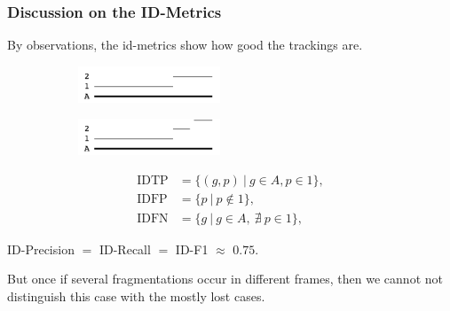 \documentclass[slidetop, mathserif, dvipsnames]{beamer}
\begin{document}
\begin{frame}
	\frametitle{Discussion on the ID-Metrics}
			
	By observations, the id-metrics show how good the trackings are.

	\quad
	
	\begin{figure}
		\begin{subfigure}{.5\textwidth}
			\centering
			\includegraphics[width=120pt]{pics/fig6.png}
		\end{subfigure}%
		\begin{subfigure}{.5\textwidth}
			\centering
			\includegraphics[width=120pt]{pics/fig7.png}
		\end{subfigure}
	\end{figure}
	\begin{minipage}{160pt}
	\begin{align*}
		\text{IDTP} & = \{(g,p)\ |\ g\in A, p\in 1\}, \\
		\text{IDFP} & = \{p\ |\ p\notin 1\}, \\
		\text{IDFN} & = \{g\ |\ g\in A, ~ \nexists\ p\in 1\},
	\end{align*}
	\end{minipage}
	\begin{minipage}{120pt}
		ID-Precision $=$ ID-Recall $=$ ID-F1 $\approx$ $0.75$.
	\end{minipage}

	\vspace{5pt}

	But once if several fragmentations occur in different frames,
	then we cannot not distinguish this case with the mostly lost cases.

\end{frame}
\end{document}
